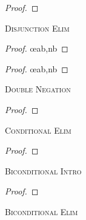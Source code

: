\begin{multicols}{2}
\begin{proof}
	 
\end{proof}
\bigskip


\noindent\textsc{Disjunction Elim}

\begin{proof}
	 \oe{ab,nb}
\end{proof}

\begin{proof}
	 \oe{ab,nb}
\end{proof}
\bigskip

\noindent\textsc{Double Negation}

\begin{proof}
	 
\end{proof}


\begin{comment} %
\begin{proof}
	\have[m]{a}{\textcolor{blue}{\enot\enot\meta{A}}}
	\have[\ ]{c}{\textcolor{red2}{\meta{A}}} \dn{a}
\end{proof}
\end{comment} %

\newpage %


\noindent\textsc{Conditional Elim}

\begin{proof}
	 
\end{proof}
\bigskip


\noindent\textsc{Biconditional Intro}

\begin{proof}
	 
	\end{proof}
\bigskip


\noindent\textsc{Biconditional Elim}


\end{multicols}
